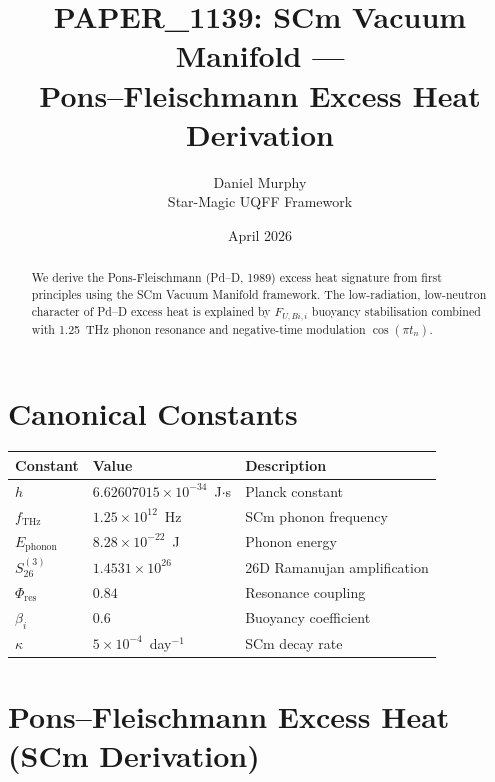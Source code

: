 \documentclass[11pt,a4paper]{article}
\title{PAPER\_1139: SCm Vacuum Manifold ---\\Pons--Fleischmann Excess Heat Derivation}
\author{Daniel Murphy\\Star-Magic UQFF Framework}
\date{April 2026}
\begin{document}
\maketitle

\begin{abstract}
We derive the Pons-Fleischmann (Pd--D, 1989) excess heat signature from first principles
using the SCm Vacuum Manifold framework. The low-radiation, low-neutron character of
Pd--D excess heat is explained by $F_{U,Bi,i}$ buoyancy stabilisation combined with
1.25~THz phonon resonance and negative-time modulation $\cos(\pi t_n)$.
\end{abstract}

\section{Canonical Constants}
\begin{center}
\begin{tabular}{@{}lll@{}}
\toprule
Constant & Value & Description \\ \midrule
$h$ & $6.62607015\times10^{-34}$~J$\cdot$s & Planck constant \\
$f_{\text{THz}}$ & $1.25\times10^{12}$~Hz & SCm phonon frequency \\
$E_{\text{phonon}}$ & $8.28\times10^{-22}$~J & Phonon energy \\
$S_{26}^{(3)}$ & $1.4531\times10^{26}$ & 26D Ramanujan amplification \\
$\Phi_{\text{res}}$ & $0.84$ & Resonance coupling \\
$\beta_i$ & $0.6$ & Buoyancy coefficient \\
$\kappa$ & $5\times10^{-4}$~day$^{-1}$ & SCm decay rate \\
\bottomrule
\end{tabular}
\end{center}

\section{Pons--Fleischmann Excess Heat (SCm Derivation)}
\end{document}
